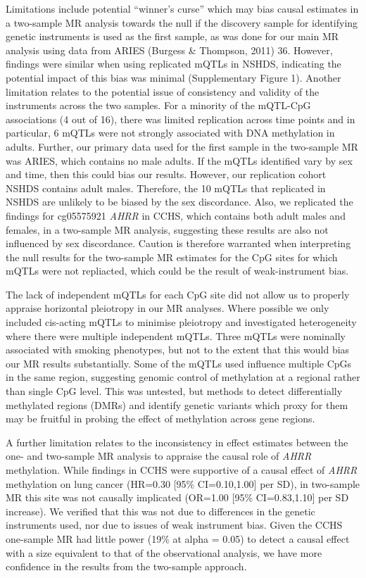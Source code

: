 \documentclass[11pt,twoside]{bristolthesis}
\begin{document}
Limitations include potential ``winner's curse'' which may bias causal estimates in a two-sample MR analysis towards the null if the discovery sample for identifying genetic instruments is used as the first sample, as was done for our main MR analysis using data from ARIES (Burgess \& Thompson, 2011) 36. However, findings were similar when using replicated mQTLs in NSHDS, indicating the potential impact of this bias was minimal (Supplementary Figure 1). Another limitation relates to the potential issue of consistency and validity of the instruments across the two samples. For a minority of the mQTL-CpG associations (4 out of 16), there was limited replication across time points and in particular, 6 mQTLs were not strongly associated with DNA methylation in adults. Further, our primary data used for the first sample in the two-sample MR was ARIES, which contains no male adults. If the mQTLs identified vary by sex and time, then this could bias our results. However, our replication cohort NSHDS contains adult males. Therefore, the 10 mQTLs that replicated in NSHDS are unlikely to be biased by the sex discordance. Also, we replicated the findings for cg05575921 \emph{AHRR} in CCHS, which contains both adult males and females, in a two-sample MR analysis, suggesting these results are also not influenced by sex discordance. Caution is therefore warranted when interpreting the null results for the two-sample MR estimates for the CpG sites for which mQTLs were not repliacted, which could be the result of weak-instrument bias.

The lack of independent mQTLs for each CpG site did not allow us to properly appraise horizontal pleiotropy in our MR analyses. Where possible we only included cis-acting mQTLs to minimise pleiotropy and investigated heterogeneity where there were multiple independent mQTLs. Three mQTLs were nominally associated with smoking phenotypes, but not to the extent that this would bias our MR results substantially. Some of the mQTLs used influence multiple CpGs in the same region, suggesting genomic control of methylation at a regional rather than single CpG level. This was untested, but methods to detect differentially methylated regions (DMRs) and identify genetic variants which proxy for them may be fruitful in probing the effect of methylation across gene regions.

A further limitation relates to the inconsistency in effect estimates between the one- and two-sample MR analysis to appraise the causal role of \emph{AHRR} methylation. While findings in CCHS were supportive of a causal effect of \emph{AHRR} methylation on lung cancer (HR=0.30 {[}95\% CI=0.10,1.00{]} per SD), in two-sample MR this site was not causally implicated (OR=1.00 {[}95\% CI=0.83,1.10{]} per SD increase). We verified that this was not due to differences in the genetic instruments used, nor due to issues of weak instrument bias. Given the CCHS one-sample MR had little power (19\% at alpha = 0.05) to detect a causal effect with a size equivalent to that of the observational analysis, we have more confidence in the results from the two-sample approach.
\end{document}
